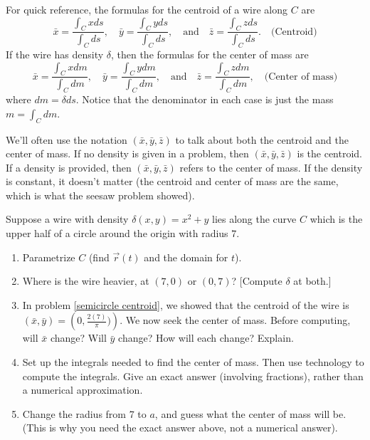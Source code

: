 For quick reference, the formulas for the centroid of a wire along $C$ are
$$
\bar x = \frac{\int_C x ds}{\int_C  ds},\quad
\bar y = \frac{\int_C y ds}{\int_C  ds},\quad 
\text{and}\quad
\bar z = \frac{\int_C z ds}{\int_C  ds}.  \quad\text{(Centroid)}
$$
If the wire has density $\delta$, then the formulas for the center of mass are 
%
$$
\bar x = \frac{\int_C x dm}{\int_C  dm},\quad
\bar y = \frac{\int_C y dm}{\int_C  dm},\quad 
\text{and}\quad
\bar z = \frac{\int_C z dm}{\int_C  dm},  \quad\text{(Center of mass)}
$$
where $dm=\delta ds$. Notice that the denominator in each case is just the mass $m=\int_C dm$.

We'll often use the notation $(\bar x, \bar y,\bar z)$ to talk about both the centroid and the center of mass. If no density is given in a problem, then $(\bar x, \bar y,\bar z)$ is the centroid. If a density is provided, then $(\bar x, \bar y,\bar z)$ refers to the center of mass. If the density is constant, it doesn't matter (the centroid and center of mass are the same, which is what the seesaw problem showed).

\begin{problem}
%
Suppose a wire with density $\delta(x,y)=x^2+y$ lies along the curve $C$ which is the upper half of a circle around the origin with radius $7$.
\begin{enumerate}
\item Parametrize $C$ (find $\vec r(t)$ and the domain for $t$).
 \item Where is the wire heavier, at $(7,0)$ or $(0,7)$? [Compute $\delta$ at both.]
 \item In problem \ref{semicircle centroid}, we showed that the centroid of the wire is $(\bar x, \bar y) = \left(0,\frac{2(7)}{\pi})\right)$.  We now seek the center of mass. Before computing, will $\bar x$ change?  Will $\bar y$ change?  How will each change? Explain.
 \item Set up the integrals needed to find the center of mass. Then use technology to compute the integrals. Give an exact answer (involving fractions), rather than a numerical approximation.
 \item Change the radius from 7 to $a$, and guess what the center of mass will be.  (This is why you need the exact answer above, not a numerical answer).
\end{enumerate}
\end{problem}


\clearpage

